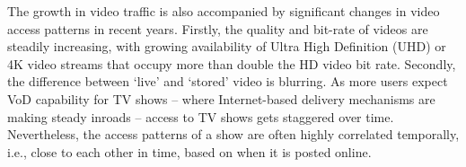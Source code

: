 \documentclass[conference]{IEEEtran}
\newcommand\JC[1]{\textcolor{red}{#1}}
\begin{document}
The growth in video traffic is also accompanied by significant changes in video access patterns in recent years. 
Firstly, the quality and bit-rate of videos are steadily increasing, with growing availability of Ultra High Definition (UHD) or 4K video streams that occupy more than double the HD video bit rate.  
Secondly, the difference between `live’ and `stored’ video is blurring. As more users expect VoD capability for TV shows -- where Internet-based delivery mechanisms are making steady inroads -- access to TV shows gets staggered over time. Nevertheless, the access patterns of a show are often highly correlated temporally, i.e., close to each other in time, based on when it is posted online. 
\end{document}

